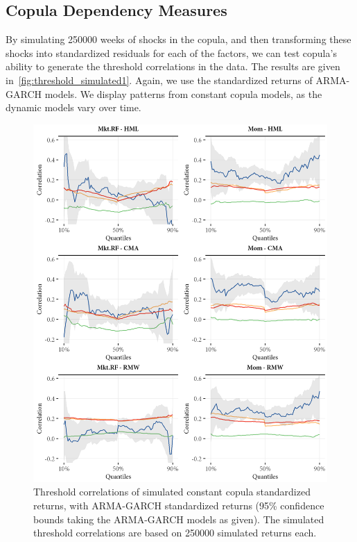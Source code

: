 
\subsection{Copula Dependency Measures} %
\label{sub:copula_dependency_measures}

By simulating 250000 weeks of shocks in the copula, and then transforming these shocks into standardized residuals for each of the factors, we can test copula's ability to generate the threshold correlations in the data. The results are given in~\autoref{fig:threshold_simulated1}. Again, we use the standardized returns of ARMA-GARCH models. We display patterns from constant copula models, as the dynamic models vary over time.

\begin{figure}[!ht]
  \centering
  \includegraphics[scale=1]{graphics/threshold_simulated1.png}  

  \caption{Threshold correlations of simulated constant copula standardized returns, with ARMA-GARCH standardized returns (95\% confidence bounds taking the ARMA-GARCH models as given). The simulated threshold correlations are based on 250000 simulated returns each.}
  
  \label{fig:threshold_simulated1}
\end{figure}
